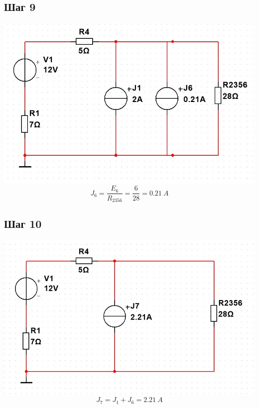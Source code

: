 \documentclass[14pt, a4paper]{article}
\begin{document}
    \subsection*{Шаг 9}
    \includegraphics[width=1\textwidth]{Stage9.jpg}
    $$J_6 = \frac{E_6}{R_{2356}} = \frac{6}{28} = 0.21 \ A$$

    \subsection*{Шаг 10}
    \includegraphics[width=1\textwidth]{Stage10.jpg}
    $$J_7 = J_1 + J_6 = 2.21 \ A$$
\end{document}
